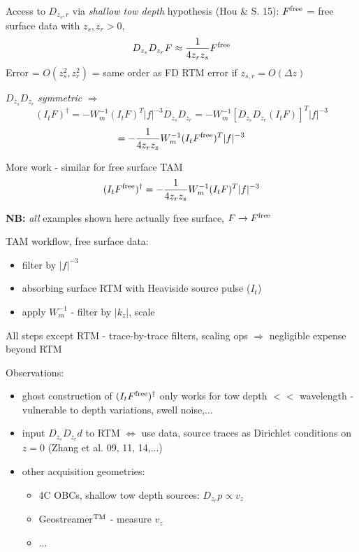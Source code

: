 \documentclass[xcolor=dvipsnames,12pt,aspectratio=169]{beamer}
\begin{document}
\begin{frame}
Access to $D_{z_s,r}$ via {\em shallow tow depth} hypothesis (Hou \& S. 15): $F^{\rm free}$ = free surface data with $z_s, z_r > 0$,
\[
D_{z_s}D_{z_r}F \approx \frac{1}{4 z_r z_s}F^{\rm free}
\]
Error = $O(z_s^2, z_r^2)$ = same order as FD RTM error if $z_{s,r} = O(\Delta z)$

$D_{z_s}D_{z_r}$ {\em symmetric} $\Rightarrow$
\[
(I_tF)^{\dagger} = -W_m^{-1}(I_tF)^T|f|^{-3}D_{z_s}D_{z_r} = -W_m^{-1}[D_{z_s}D_{z_r}(I_tF)]^T|f|^{-3}
\]
\[
=-\frac{1}{4 z_r z_s}W_m^{-1}(I_tF^{\rm free})^T|f|^{-3}
\]
\end{frame}


\begin{frame}
More work - similar for free surface TAM
\[
(I_tF^{\rm free})^{\dagger} =-\frac{1}{4 z_r z_s}W_m^{-1}(I_tF)^T|f|^{-3}
\]

{\bf NB:} {\em all} examples shown here actually free surface, $F \rightarrow F^{\rm free}$

TAM workflow, free surface data:
\begin{itemize}
\item filter by $|f|^{-3}$
\item absorbing surface RTM with Heaviside source pulse ($I_t$)
\item apply $W_m^{-1}$ - filter by $|k_z|$, scale
\end{itemize}

All steps except RTM - trace-by-trace filters, scaling ops $\Rightarrow$ {\color{blue} negligible expense beyond RTM}
\end{frame}

\begin{frame}
Observations:

\begin{itemize}
\item ghost construction of $(I_tF^{\rm free})^{\dagger}$ only works for tow depth $<<$ wavelength - vulnerable to depth variations, swell noise,...
\item input $D_{z_s}D_{z_r} d$ to RTM $\Leftrightarrow$ use data, source traces as Dirichlet conditions on $z=0$ (Zhang et al. 09, 11, 14,...)
\item other acquisition geometries: 
\begin{itemize}
\item 4C OBCs, shallow tow depth sources: $D_{z_r}p \propto v_z$ 
\item Geostreamer$^{\rm TM}$ - measure $v_z$
\item ...
\end{itemize}
\end{itemize}
\end{frame}
\end{document}

